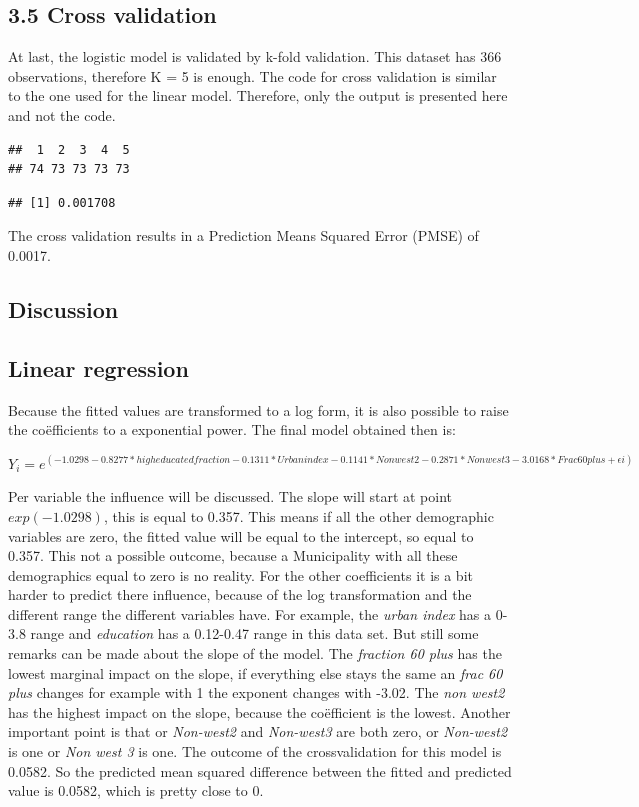 \documentclass[11pt,]{article}
\begin{document}
\subsection{3.5 Cross validation}\label{cross-validation-1}

At last, the logistic model is validated by k-fold validation. This
dataset has 366 observations, therefore K = 5 is enough. The code for
cross validation is similar to the one used for the linear model.
Therefore, only the output is presented here and not the code.

\begin{verbatim}
##  1  2  3  4  5 
## 74 73 73 73 73
\end{verbatim}

\begin{verbatim}
## [1] 0.001708
\end{verbatim}

The cross validation results in a Prediction Means Squared Error (PMSE)
of 0.0017.

\subsection{Discussion}\label{discussion}

\subsection{Linear regression}\label{linear-regression}

Because the fitted values are transformed to a log form, it is also
possible to raise the coëfficients to a exponential power. The final
model obtained then is:

\(Y_i = e^{(-1.0298 -0.8277*high educated fraction -0.1311*Urban index -0.1141*Non west2 -0.2871*Non west3 -3.0168*Frac 60plus + \epsilon i)}\)

Per variable the influence will be discussed. The slope will start at
point \(exp(-1.0298)\), this is equal to 0.357. This means if all the
other demographic variables are zero, the fitted value will be equal to
the intercept, so equal to 0.357. This not a possible outcome, because a
Municipality with all these demographics equal to zero is no reality.
For the other coefficients it is a bit harder to predict there
influence, because of the log transformation and the different range the
different variables have. For example, the \emph{urban index} has a
0-3.8 range and \emph{education} has a 0.12-0.47 range in this data set.
But still some remarks can be made about the slope of the model. The
\emph{fraction 60 plus} has the lowest marginal impact on the slope, if
everything else stays the same an \emph{frac 60 plus} changes for
example with 1 the exponent changes with -3.02. The \emph{non west2} has
the highest impact on the slope, because the coëfficient is the lowest.
Another important point is that or \emph{Non-west2} and \emph{Non-west3}
are both zero, or \emph{Non-west2} is one or \emph{Non west 3} is one.
The outcome of the crossvalidation for this model is 0.0582. So the
predicted mean squared difference between the fitted and predicted value
is 0.0582, which is pretty close to 0.
\end{document}
